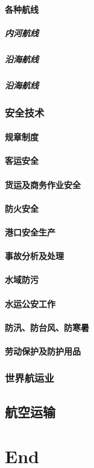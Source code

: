 \documentclass[UTF8]{../ApplicationUniverse}
\begin{document}
        \subsubsection{各种航线}
            \paragraph{内河航线}
            \paragraph{沿海航线}
            \paragraph{沿海航线}
    \subsection{安全技术}
        \subsubsection{规章制度}
        \subsubsection{客运安全}
        \subsubsection{货运及商务作业安全}
        \subsubsection{防火安全}
        \subsubsection{港口安全生产}
        \subsubsection{事故分析及处理}
        \subsubsection{水域防污}
        \subsubsection{水运公安工作}
        \subsubsection{防汛、防台风、防寒暑}
        \subsubsection{劳动保护及防护用品}
    \subsection{世界航运业}
\section{航空运输}







\chapter{End}
\end{document}
